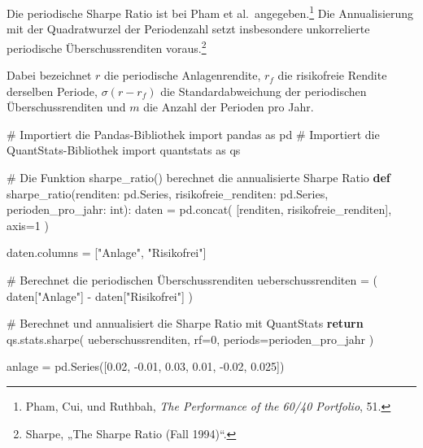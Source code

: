 \documentclass[
  ngerman,
  a4paper,
  DIV=11,
  oneside]{scrreprt}
\newenvironment{Shaded}{\begin{snugshade}}{\end{snugshade}}
\newcommand{\BuiltInTok}[1]{\textcolor[rgb]{0.00,0.23,0.31}{#1}}
\newcommand{\CommentTok}[1]{\textcolor[rgb]{0.37,0.37,0.37}{#1}}
\newcommand{\ControlFlowTok}[1]{\textcolor[rgb]{0.00,0.23,0.31}{\textbf{#1}}}
\newcommand{\DecValTok}[1]{\textcolor[rgb]{0.68,0.00,0.00}{#1}}
\newcommand{\FloatTok}[1]{\textcolor[rgb]{0.68,0.00,0.00}{#1}}
\newcommand{\ImportTok}[1]{\textcolor[rgb]{0.00,0.46,0.62}{#1}}
\newcommand{\KeywordTok}[1]{\textcolor[rgb]{0.00,0.23,0.31}{\textbf{#1}}}
\newcommand{\NormalTok}[1]{\textcolor[rgb]{0.00,0.23,0.31}{#1}}
\newcommand{\OperatorTok}[1]{\textcolor[rgb]{0.37,0.37,0.37}{#1}}
\newcommand{\StringTok}[1]{\textcolor[rgb]{0.13,0.47,0.30}{#1}}
\begin{document}
Die periodische Sharpe Ratio ist bei Pham et al.~angegeben.\footnote{Pham,
  Cui, und Ruthbah, \emph{The {Performance} of the 60/40 {Portfolio}},
  51.} Die Annualisierung mit der Quadratwurzel der Periodenzahl setzt
insbesondere unkorrelierte periodische Überschussrenditen
voraus.\footnote{Sharpe, {„The {Sharpe Ratio} ({Fall} 1994)``}.}

Dabei bezeichnet \textbf{\(r\)} die periodische Anlagenrendite,
\textbf{\(r_f\)} die risikofreie Rendite derselben Periode,
\textbf{\(\sigma(r-r_f)\)} die Standardabweichung der periodischen
Überschussrenditen und \textbf{\(m\)} die Anzahl der Perioden pro Jahr.

\begin{Shaded}
\begin{Highlighting}[]
\CommentTok{\# Importiert die Pandas{-}Bibliothek}
\ImportTok{import}\NormalTok{ pandas }\ImportTok{as}\NormalTok{ pd}
\CommentTok{\# Importiert die QuantStats{-}Bibliothek}
\ImportTok{import}\NormalTok{ quantstats }\ImportTok{as}\NormalTok{ qs}


\CommentTok{\# Die Funktion sharpe\_ratio() berechnet die annualisierte Sharpe Ratio}
\KeywordTok{def}\NormalTok{ sharpe\_ratio(renditen: pd.Series, risikofreie\_renditen: pd.Series, perioden\_pro\_jahr: }\BuiltInTok{int}\NormalTok{):}
\NormalTok{    daten }\OperatorTok{=}\NormalTok{ pd.concat(}
\NormalTok{        [renditen, risikofreie\_renditen],}
\NormalTok{        axis}\OperatorTok{=}\DecValTok{1}
\NormalTok{    )}

\NormalTok{    daten.columns }\OperatorTok{=}\NormalTok{ [}\StringTok{"Anlage"}\NormalTok{, }\StringTok{"Risikofrei"}\NormalTok{]}

    \CommentTok{\# Berechnet die periodischen Überschussrenditen}
\NormalTok{    ueberschussrenditen }\OperatorTok{=}\NormalTok{ (}
\NormalTok{        daten[}\StringTok{"Anlage"}\NormalTok{]}
        \OperatorTok{{-}}\NormalTok{ daten[}\StringTok{"Risikofrei"}\NormalTok{]}
\NormalTok{    )}

    \CommentTok{\# Berechnet und annualisiert die Sharpe Ratio mit QuantStats}
    \ControlFlowTok{return}\NormalTok{ qs.stats.sharpe(}
\NormalTok{        ueberschussrenditen,}
\NormalTok{        rf}\OperatorTok{=}\DecValTok{0}\NormalTok{,}
\NormalTok{        periods}\OperatorTok{=}\NormalTok{perioden\_pro\_jahr}
\NormalTok{    )}


\NormalTok{anlage }\OperatorTok{=}\NormalTok{ pd.Series([}\FloatTok{0.02}\NormalTok{, }\OperatorTok{{-}}\FloatTok{0.01}\NormalTok{, }\FloatTok{0.03}\NormalTok{, }\FloatTok{0.01}\NormalTok{, }\OperatorTok{{-}}\FloatTok{0.02}\NormalTok{, }\FloatTok{0.025}\NormalTok{])}


\end{Highlighting}
\end{Shaded}
\end{document}
